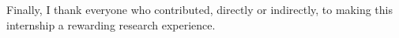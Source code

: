 \documentclass[11pt]{report}
\begin{document}
Finally, I thank everyone who contributed, directly or indirectly, to making this internship a rewarding research experience.



\newpage
\tableofcontents
\clearpage
{}












\printbibliography

\newpage

\end{document}

